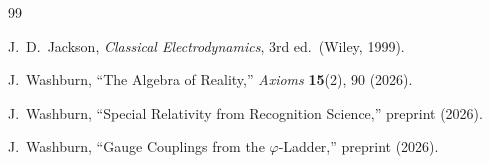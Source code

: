\documentclass[12pt,a4paper]{article}
\theoremstyle{definition}
\theoremstyle{remark}
\begin{document}
\begin{thebibliography}{99}

J.~D.~Jackson, \textit{Classical Electrodynamics}, 3rd ed.\
(Wiley, 1999).

J.~Washburn, ``The Algebra of Reality,'' \textit{Axioms} \textbf{15}(2), 90 (2026).

J.~Washburn, ``Special Relativity from Recognition Science,'' preprint (2026).

J.~Washburn, ``Gauge Couplings from the $\varphi$-Ladder,'' preprint (2026).

\end{thebibliography}
\end{document}
